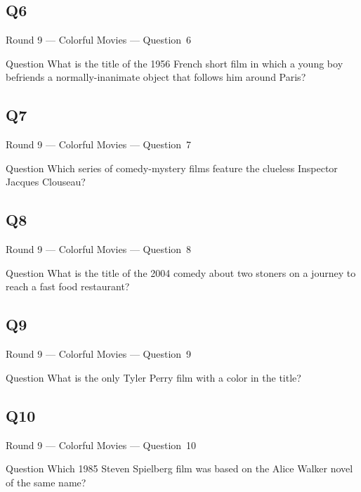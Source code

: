 \documentclass[11pt]{beamer}
\begin{document}
\subsection*{Q6}
\begin{frame}[t]{Round 9 --- Colorful Movies --- \mbox{Question 6}}
\vspace{-0.5em}
\begin{block}{Question}
What is the title of the 1956 French short film in which a young boy befriends a normally-inanimate object that follows him around Paris?
\end{block}
\end{frame}
\subsection*{Q7}
\begin{frame}[t]{Round 9 --- Colorful Movies --- \mbox{Question 7}}
\vspace{-0.5em}
\begin{block}{Question}
Which series of comedy-mystery films feature the clueless Inspector Jacques Clouseau?
\end{block}
\end{frame}
\subsection*{Q8}
\begin{frame}[t]{Round 9 --- Colorful Movies --- \mbox{Question 8}}
\vspace{-0.5em}
\begin{block}{Question}
What is the title of the 2004 comedy about two stoners on a journey to reach a fast food restaurant?
\end{block}
\end{frame}
\subsection*{Q9}
\begin{frame}[t]{Round 9 --- Colorful Movies --- \mbox{Question 9}}
\vspace{-0.5em}
\begin{block}{Question}
What is the only Tyler Perry film with a color in the title?
\end{block}
\end{frame}
\subsection*{Q10}
\begin{frame}[t]{Round 9 --- Colorful Movies --- \mbox{Question 10}}
\vspace{-0.5em}
\begin{block}{Question}
Which 1985 Steven Spielberg film was based on the Alice Walker novel of the same name?
\end{block}
\end{frame}
\end{document}

